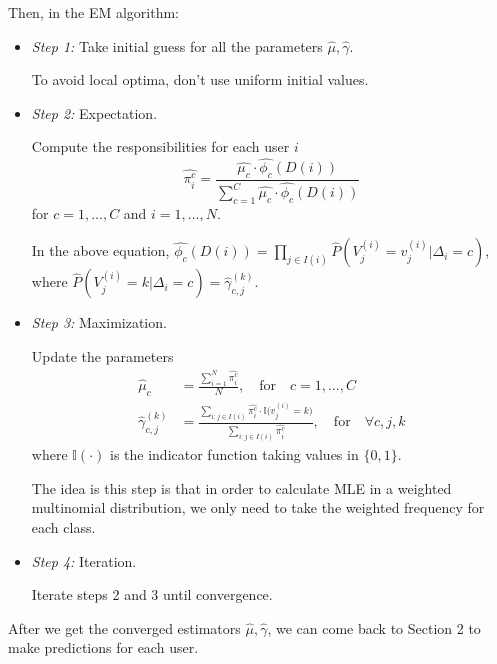 \documentclass[a4paper,10pt]{article}
\begin{document}
Then, in the EM algorithm: 
\begin{itemize}
\item \emph{Step 1:} Take initial guess for all the parameters $\hat{\mu}, \hat{\gamma}$. 

To avoid local optima, don't use uniform initial values.

\item \emph{Step 2:} Expectation.

Compute the responsibilities for each user $i$
\begin{equation}
	\hat{\pi_i^c} = \frac{\hat{\mu_c} \cdot \hat{\phi_c}(D(i))}{\sum_{c = 1}^{C}\hat{\mu_c} \cdot \hat{\phi_c}(D(i))}
\end{equation}
for $c = 1, ..., C$ and $ i = 1, ..., N$.

In the above equation, $ \hat{\phi_c}(D(i)) = \prod_{j \in I(i)}\hat{P}(V_j^{(i)} = v_j^{(i)} | \Delta_i = c)$, where $  \hat{P}(V_j^{(i)} = k | \Delta_{i} = c) = \hat{\gamma}_{c, j}^{(k)}$.

\item \emph{Step 3:} Maximization.

Update the parameters
\begin{equation}
\begin{split}
\hat{\mu}_c &= \frac{\sum_{i = 1}^{N}\hat{\pi_i^c}}{N}, \quad \text{for} \quad c = 1, ..., C \\
\hat{\gamma}_{c, j}^{(k)} &= \frac{\sum_{i: j\in I(i)} \hat{\pi_i^c} \cdot \mathbb{I}\big( v_j^{(i)} = k \big)}{\sum_{i: j\in I(i)}\hat{\pi_i^c}}, \quad \text{for} \quad \forall c, j, k
\end{split}
\end{equation}
where $\mathbb{I}(\cdot)$ is the indicator function taking values in $\{0, 1\}$.

The idea is this step is that in order to calculate MLE in a weighted multinomial distribution, we only need to take the weighted frequency for each class.

\item \emph{Step 4:} Iteration.

Iterate steps 2 and 3 until convergence.
\end{itemize}

After we get the converged estimators $\hat{\mu}, \hat{\gamma}$, we can come back to Section 2 to make predictions for each user.















	
\end{document}
